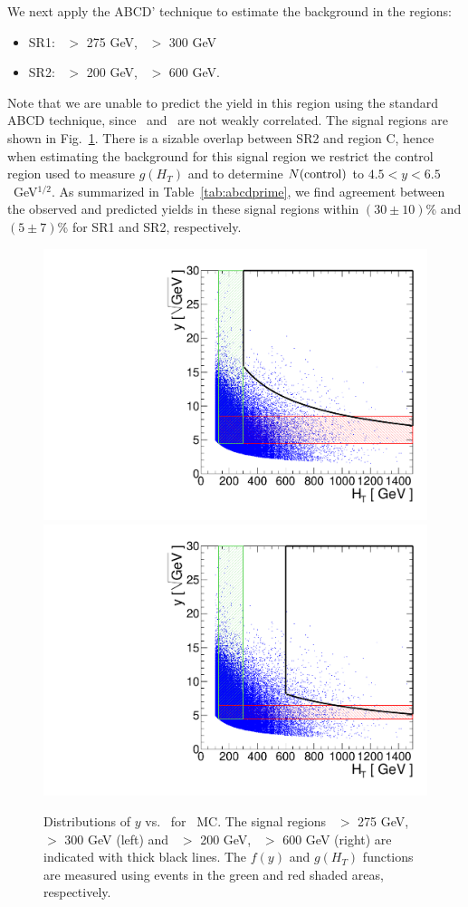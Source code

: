 We next apply the ABCD' technique to estimate the background in the regions:

\begin{itemize}
\item SR1: \met\ $>$ 275 GeV, \Ht\ $>$ 300 GeV
\item SR2: \met\ $>$ 200 GeV, \Ht\ $>$ 600 GeV. 
\end{itemize}

Note that we are unable to predict the yield in this region using
the standard ABCD technique, since \met\ and \Ht\ are not weakly correlated. The signal
regions are shown in Fig.~\ref{fig:abcdprime_met}. There is a sizable overlap between
SR2 and region C, hence when estimating the background for this signal region we
restrict the control region used to measure $g(H_T)$ and to determine  $N({\rm control})$ 
to $4.5 < y < 6.5$~GeV$^{1/2}$.
As summarized in Table~\ref{tab:abcdprime}, we find agreement between the observed and
predicted yields in these signal regions within $(30 \pm 10)$\% and $(5 \pm 7)$\% for SR1 and SR2, respectively. 

\begin{figure}[hbt]
\begin{center}
\includegraphics[width=0.48\linewidth]{plots/abcdprime_met275_ht300.pdf}
\includegraphics[width=0.48\linewidth]{plots/abcdprime_met200_ht600.pdf}
\caption{\label{fig:abcdprime_met}\protect 
Distributions of $y$ vs. \Ht\ for \ttbar\ MC. The signal regions \met\ $>$ 275 GeV, \Ht\ $>$ 300 GeV (left)
and \met\ $>$ 200 GeV, \Ht\ $>$ 600 GeV (right) are indicated with thick black lines. The $f(y)$ and $g(H_T)$ 
functions are measured using events in the green and red shaded areas, respectively.
}
\end{center}
\end{figure}


